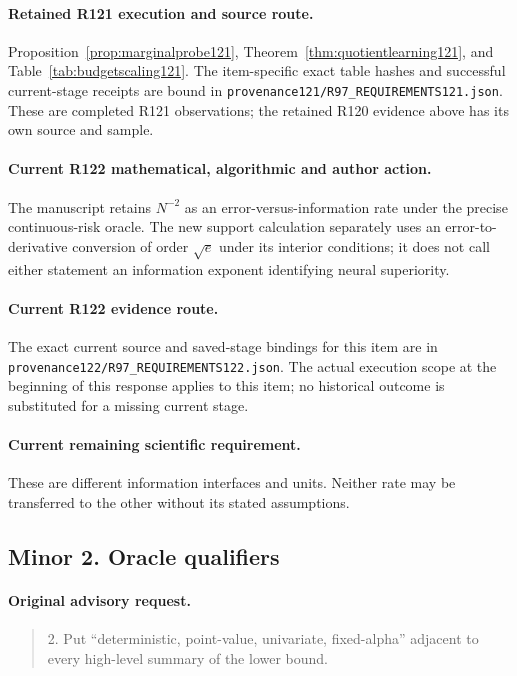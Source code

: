 \paragraph{Retained R121 execution and source route.}
Proposition~\ref{prop:marginalprobe121}, Theorem~\ref{thm:quotientlearning121}, and Table~\ref{tab:budgetscaling121}.
The item-specific exact table hashes and successful current-stage receipts are bound in \nolinkurl{provenance121/R97_REQUIREMENTS121.json}. These are completed R121 observations; the retained R120 evidence above has its own source and sample.
\paragraph{Current R122 mathematical, algorithmic and author action.}
The manuscript retains $N^{-2}$ as an error-versus-information rate under the precise continuous-risk oracle. The new support calculation separately uses an error-to-derivative conversion of order $\sqrt e$ under its interior conditions; it does not call either statement an information exponent identifying neural superiority.
\paragraph{Current R122 evidence route.}
The exact current source and saved-stage bindings for this item are in \nolinkurl{provenance122/R97_REQUIREMENTS122.json}. The actual execution scope at the beginning of this response applies to this item; no historical outcome is substituted for a missing current stage.
\paragraph{Current remaining scientific requirement.}
These are different information interfaces and units. Neither rate may be transferred to the other without its stated assumptions.

\subsection{Minor 2. Oracle qualifiers}
\label{response122:minor-2}

\paragraph{Original advisory request.}
\begin{quote}
2. Put “deterministic, point-value, univariate, fixed-alpha” adjacent to every high-level summary of the lower bound.
\end{quote}

